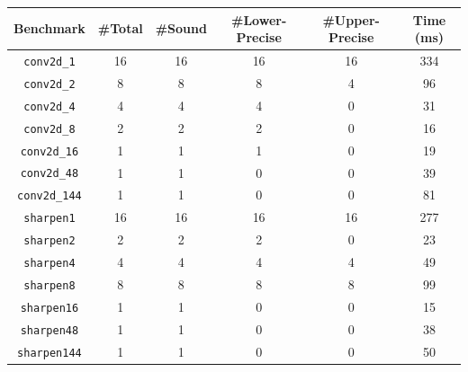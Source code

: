\begin{tabular}{cccccc}
    \toprule
    \textbf{Benchmark} & \textbf{\#Total}  & \textbf{\#Sound} & \textbf{\#Lower-Precise} & \textbf{\#Upper-Precise} & \textbf{Time (ms)} \\
    \midrule
    \texttt{conv2d\_1} & 16 & 16 & 16 & 16 & 334 \\
    \texttt{conv2d\_2} & 8 & 8 & 8 & 4 & 96 \\
    \texttt{conv2d\_4} & 4 & 4 & 4 & 0 & 31 \\
    \texttt{conv2d\_8} & 2 & 2 & 2 & 0 & 16 \\
    \texttt{conv2d\_16} & 1 & 1 & 1 & 0 & 19 \\
    \texttt{conv2d\_48} & 1 & 1 & 0 & 0 & 39 \\
    \texttt{conv2d\_144} & 1 & 1 & 0 & 0 & 81 \\
    \texttt{sharpen1} & 16 & 16 & 16 & 16 & 277 \\
    \texttt{sharpen2} & 2 & 2 & 2 & 0 & 23 \\
    \texttt{sharpen4} & 4 & 4 & 4 & 4 & 49 \\
    \texttt{sharpen8} & 8 & 8 & 8 & 8 & 99 \\
    \texttt{sharpen16} & 1 & 1 & 0 & 0 & 15 \\
    \texttt{sharpen48} & 1 & 1 & 0 & 0 & 38 \\
    \texttt{sharpen144} & 1 & 1 & 0 & 0 & 50 \\
    \bottomrule
\end{tabular}
